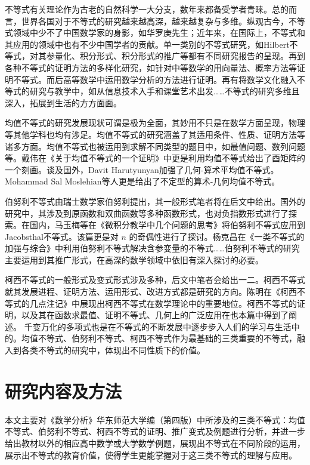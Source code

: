 不等式有关理论作为古老的自然科学一大分支，数年来都备受学者青睐。总的而言，世界各国对于不等式的研究越来越高深，越来越复杂与多维。纵观古今，不等式领域中少不了中国数学家的身影，如华罗庚先生；近年来，在国际上，不等式和其应用的领域中也有不少中国学者的贡献。单一类别的不等式研究，如Hilbert不等式，对其参量化、积分形式、积分形式的推广等都有不同研究报告的呈现。再到各种不等式的证明方法的多样化研究，如针对中等数学的用向量法、概率方法等证明不等式。而后高等数学中运用数学分析的方法进行证明。再有将数学文化融入不等式的研究与教学中，如从信息技术入手和课堂艺术出发……不等式的研究多维且深入，拓展到生活的方方面面。

均值不等式的研究发展现状可谓是极为全面，其妙用不只是在数学方面呈现，物理等其他学科也均有涉足。均值不等式的研究涵盖了其适用条件、性质、证明方法等诸多方面。均值不等式也被运用到求解不同类型的题目中，如最值问题、数列问题等\cite{moslehian2021arithmetic}。戴伟在《关于均值不等式的一个证明》中更是利用均值不等式给出了酉矩阵的一个刻画\cite{戴伟2020关于均值不等式的一个证明}。谈及国外，Davit Harutyunyan加强了几何-算术平均值不等式\cite{harutyunyan2018cauchy}。Mohammad Sal Moslehian等人更是给出了不定型的算术-几何均值不等式\cite{moslehian2021arithmetic}。

伯努利不等式由瑞士数学家伯努利提出，其一般形式笔者将在后文中给出。国外的研究中，其涉及到原函数和双曲函数等多种函数形式，也对负指数形式进行了探索。在国内，马玉梅等在《微积分教学中几个问题的思考》将伯努利不等式应用到Jacobsthal不等式\cite{马玉梅2020微积分教学中几个问题的思考}。该篇更是对 $n$ 的奇偶性进行了探讨。杨克昌在《一类不等式的加强与综合》中利用伯努利不等式解决含参变量的不等式\cite{杨克昌1997一类不等式的加强与综合}……伯努利不等式的研究主要运用到其推广形式，在高深的数学领域中依旧有深入探讨的必要。

柯西不等式的一般形式及变式形式涉及多种，后文中笔者会给出一二。柯西不等式就其发展进程、证明方法、运用形式、改进方式都是研究的方向。陈明在《柯西不等式的几点注记》中展现出柯西不等式在数学理论中的重要地位\cite{陈明2018柯西不等式的几点注记}。柯西不等式的证明，以及其在函数求最值、证明不等式、几何上的广泛应用在也本篇中得到了阐述。
千变万化的多项式也是在不等式的不断发展中逐步步入人们的学习与生活中的。均值不等式、伯努利不等式、柯西不等式作为最基础的三类重要的不等式，融入到各类不等式的研究中，体现出不同性质下的价值。

\section{研究内容及方法}

本文主要对《数学分析》华东师范大学编（第四版）中所涉及的三类不等式：均值不等式、伯努利不等式、柯西不等式的证明、推广变式及例题进行分析，并进一步给出教材以外的相应高中数学或大学数学例题，展现出不等式在不同阶段的运用，展示出不等式的教育价值，使得学生更能掌握对于这三类不等式的理解与应用。

